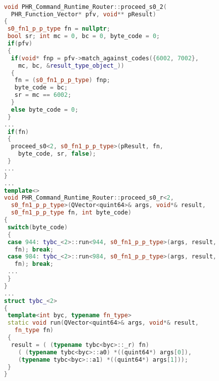 \tmphs\begin{lstlisting}[caption={\emblink{\#lst--PVMrt--\thelstlisting.pgvm-pdf}{Identifying Function
 Equivalence Classes}},
language = C++, numbers = none, label={lst:figPVMrt},
    basicstyle = \ttfamily\bfseries\tiny, linewidth = .95\linewidth] 

void PHR_Command_Runtime_Router::proceed_s0_2(
  PHR_Function_Vector* pfv, void** pResult)
{
 s0_fn1_p_p_type fn = nullptr;
 bool sr; int mc = 0, bc = 0, byte_code = 0;
 if(pfv)
 {
  if(void* fnp = pfv->match_against_codes({6002, 7002}, 
    mc, bc, &result_type_object_))
  {
   fn = (s0_fn1_p_p_type) fnp;
   byte_code = bc;
   sr = mc == 6002;
  }
  else byte_code = 0;
 } 
... 
 if(fn)
 {
  proceed_s0<2, s0_fn1_p_p_type>(pResult, fn, 
    byte_code, sr, false);
 } 
...
}
...
template<>
void PHR_Command_Runtime_Router::proceed_s0_r<2, 
  s0_fn1_p_p_type>(QVector<quint64>& args, void*& result,
  s0_fn1_p_p_type fn, int byte_code)
{
 switch(byte_code)
 {
 case 944: tybc_<2>::run<944, s0_fn1_p_p_type>(args, result, 
   fn); break;
 case 984: tybc_<2>::run<984, s0_fn1_p_p_type>(args, result, 
   fn); break; 
 ...
 }
}
...
struct tybc_<2>
{
 template<int byc, typename fn_type>
 static void run(QVector<quint64>& args, void*& result,
   fn_type fn)
 {
  result = ( (typename tybc<byc>::_r) fn)
    ( (typename tybc<byc>::a0) *((quint64*) args[0]),  
    (typename tybc<byc>::a1) *((quint64*) args[1]));
 }
}
\end{lstlisting}
